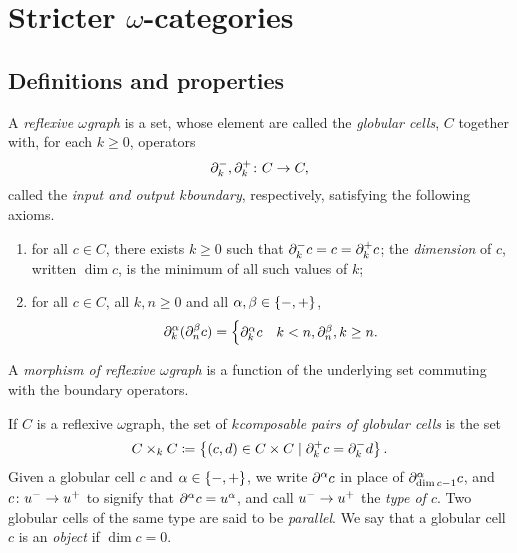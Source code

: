 \section{Stricter \texorpdfstring{$\omega$}{ω}-categories}

\subsection{Definitions and properties}

\begin{dfn} 
    A \emph{reflexive \( \omega \)\nbd graph} is a set, whose element are called the \emph{globular cells}, \( C \) together with, for each \( k \geq 0 \), operators
    \begin{equation*}
        \partial_{k}^{-}, \partial_{k}^{+} \colon C \to C,
    \end{equation*}
    called the \emph{input and output \( k \)\nbd boundary}, respectively, satisfying the following axioms.
    \begin{enumerate}
        \item for all \( c \in C \), there exists \( k \geq 0 \) such that \( \partial_{k}^{-} c = c = \partial_{k}^{+} c \); the \emph{dimension} of \( c \), written \( \dim c \), is the minimum of all such values of \( k \);
        \item for all \( c \in C \), all \( k, n \geq 0 \) and all \( \alpha, \beta \in \left\{ {-, +} \right\} \),
        \begin{equation*}
            \partial_{k}^{\alpha}(\partial_{n}^{\beta} c) = 
            \begin{cases}
                \partial_{k}^{\alpha} c & k < n,
                \partial_{n}^{\beta}, k \ge n.
            \end{cases}
        \end{equation*}
    \end{enumerate}
    A \emph{morphism of reflexive \( \omega \)\nbd graph} is a function of the underlying set commuting with the boundary operators.
\end{dfn}

\noindent If \( C \) is a reflexive \( \omega \)\nbd graph, the set of \emph{\( k \)\nbd composable pairs of globular cells} is the set 
\begin{equation*}
    C \times_k C \coloneqq \left\{ {(c, d) \in C \times C \mid \partial_{k}^{+} c = \partial_{k}^{-} d} \right\}.
\end{equation*}
Given a globular cell \( c \) and \( \alpha \in \left\{ {-, +} \right\} \), we write \( \partial_{}^{\alpha} c \) in place of \( \partial_{\dim c - 1}^{\alpha} c \), and \( c \colon u^- \to u^+ \) to signify that \( \partial_{}^{\alpha} c = u^\alpha \), and call \( u^- \to u^+ \) the \emph{type of \( c \)}. 
Two globular cells of the same type are said to be \emph{parallel}.
We say that a globular cell \( c \) is an \emph{object} if \( \dim c = 0 \). 


